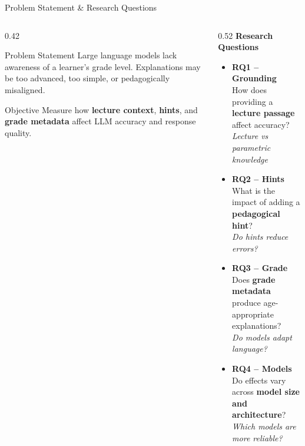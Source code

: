 \documentclass[aspectratio=169]{beamer}
\begin{document}
\begin{frame}{Problem Statement \& Research Questions}
\begin{columns}[T,onlytextwidth]

\begin{column}{0.42\textwidth}
\begin{block}{Problem Statement}
\footnotesize
Large language models lack awareness of a learner's grade level. 
Explanations may be too advanced, too simple, or pedagogically misaligned.
\end{block}

\vspace{0.1cm}

\begin{block}{Objective}
\footnotesize
Measure how \textbf{lecture context}, \textbf{hints}, and \textbf{grade metadata}
affect LLM accuracy and response quality.
\end{block}
\end{column}

\hfill

\begin{column}{0.52\textwidth}
\footnotesize
\textbf{Research Questions}


\begin{itemize}\itemsep4pt

\item \textbf{RQ1 -- Grounding}\\
How does providing a \textbf{lecture passage} affect accuracy?\\
\textit{Lecture vs parametric knowledge}

\item \textbf{RQ2 -- Hints}\\
What is the impact of adding a \textbf{pedagogical hint}?\\
\textit{Do hints reduce errors?}

\item \textbf{RQ3 -- Grade}\\
Does \textbf{grade metadata} produce age-appropriate explanations?\\
\textit{Do models adapt language?}

\item \textbf{RQ4 -- Models}\\
Do effects vary across \textbf{model size and architecture}?\\
\textit{Which models are more reliable?}

\end{itemize}

\end{column}

\end{columns}
\end{frame}
\end{document}
